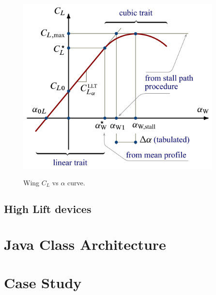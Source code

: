 \begin{figure}[H]
\centering
{\includegraphics[height=9cm]{Immagini/Wing_CL_Vs_alpha_curve.pdf}} 
\caption{Wing $C_L$ vs $\alpha$ curve.}
\label{fig:clalfa}
\end{figure}




\subsection{High Lift devices}

\section{Java Class Architecture}

\section{Case Study}
